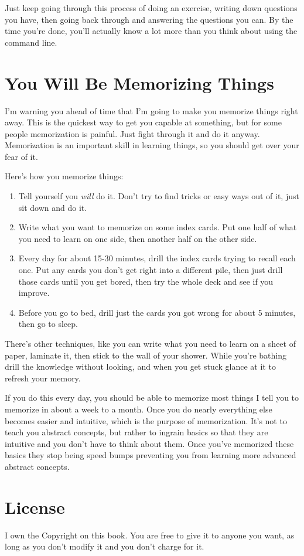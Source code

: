 Just keep going through this process of doing an exercise, writing down questions you have, then going back through and
answering the questions you can.  By the time you're done, you'll actually know a lot more than you think about
using the command line.

\section{You Will Be Memorizing Things}

I'm warning you ahead of time that I'm going to make you memorize things right away.
This is the quickest way to get you capable at something, but for some people 
memorization is painful.  Just fight through it and do it anyway.  Memorization is an
important skill in learning things, so you should get over your fear of it.

Here's how you memorize things:

\begin{enumerate}
\item Tell yourself you \emph{will} do it.  Don't try to find tricks or easy ways out of it, just sit down and do it.
\item Write what you want to memorize on some index cards.  Put one half of what you need to learn on one side, then
    another half on the other side.
\item Every day for about 15-30 minutes, drill the index cards trying to recall each one.  Put any cards you don't
    get right into a different pile, then just drill those cards until you get bored, then try the whole deck and see
    if you improve.
\item Before you go to bed, drill just the cards you got wrong for about 5 minutes, then go to sleep.
\end{enumerate}

There's other techniques, like you can write what you need to learn on a sheet of paper, laminate it, then stick to the
wall of your shower.  While you're bathing drill the knowledge without looking, and when you get stuck glance at it
to refresh your memory.

If you do this every day, you should be able to memorize most things I tell you to memorize in about a week to a
month.  Once you do nearly everything else becomes easier and intuitive, which is the purpose of memorization.
It's not to teach you abstract concepts, but rather to ingrain basics so that they are intuitive and you don't
have to think about them.  Once you've memorized these basics they stop being speed bumps preventing you from
learning more advanced abstract concepts.


\section{License}

I own the Copyright on this book.  You are free to give it to anyone you want, as long as you 
don't modify it and you don't charge for it.
